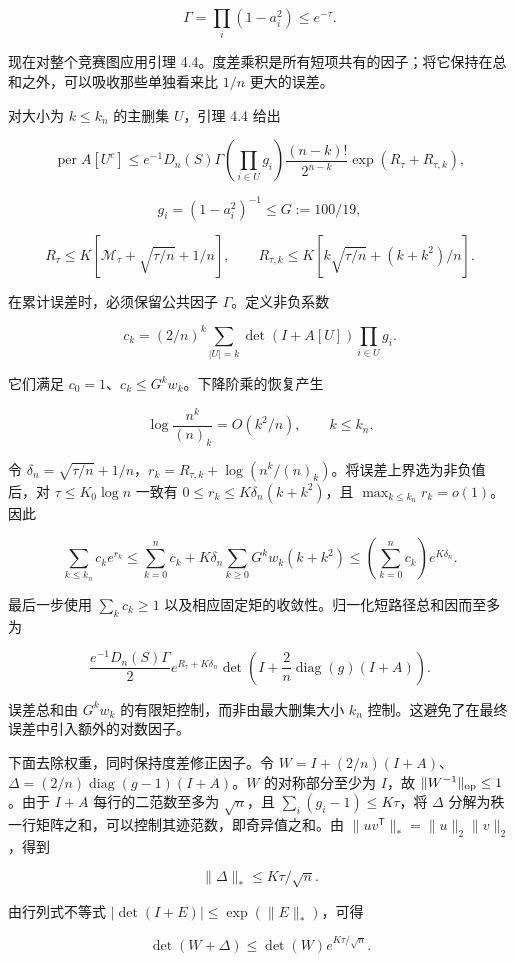 \documentclass[11pt,a4paper]{article}
\begin{document}
\[\Gamma=\prod_i(1-a_i^2)\le e^{-\tau}.\]

现在对整个竞赛图应用引理 4.4。度差乘积是所有短项共有的因子；将它保持在总和之外，可以吸收那些单独看来比 \(1/n\) 更大的误差。

对大小为 \(k\le k_n\) 的主删集 \(U\)，引理 4.4 给出

\[\operatorname{per}A[U^c]\le
e^{-1}D_n(S)\Gamma
\left(\prod_{i\in U}g_i\right)
\frac{(n-k)!}{2^{n-k}}\exp(R_\tau+R_{\tau,k}),\]

\[g_i=(1-a_i^2)^{-1}\le G:=100/19,\]

\[R_\tau\le K[\mathcal M_\tau+\sqrt{\tau/n}+1/n],\qquad
R_{\tau,k}\le K[k\sqrt{\tau/n}+(k+k^2)/n].\]

在累计误差时，必须保留公共因子 \(\Gamma\)。定义非负系数

\[c_k=(2/n)^k\sum_{|U|=k}\det(I+A[U])\prod_{i\in U}g_i.\]

它们满足 \(c_0=1\)、\(c_k\le G^kw_k\)。下降阶乘的恢复产生

\[\log\frac{n^k}{(n)_k}=O(k^2/n),\qquad k\le k_n.\]

令 \(\delta_n=\sqrt{\tau/n}+1/n\)，\(r_k=R_{\tau,k}+\log(n^k/(n)_k)\)。将误差上界选为非负值后，对 \(\tau\le K_0\log n\) 一致有 \(0\le r_k\le K\delta_n(k+k^2)\)，且 \(\max_{k\le k_n}r_k=o(1)\)。因此

\[\sum_{k\le k_n}c_ke^{r_k}
\le\sum_{k=0}^{n}c_k+
K\delta_n\sum_{k\ge0}G^kw_k(k+k^2)
\le\left(\sum_{k=0}^{n}c_k\right)e^{K\delta_n}.\]

最后一步使用 \(\sum_kc_k\ge1\) 以及相应固定矩的收敛性。归一化短路径总和因而至多为

\[\frac{e^{-1}D_n(S)\Gamma}{2}
e^{R_\tau+K\delta_n}
\det\left(I+\frac2n\operatorname{diag}(g)(I+A)\right).\]

误差总和由 \(G^kw_k\) 的有限矩控制，而非由最大删集大小 \(k_n\) 控制。这避免了在最终误差中引入额外的对数因子。

下面去除权重，同时保持度差修正因子。令 \(W=I+(2/n)(I+A)\)、\(\Delta=(2/n)\operatorname{diag}(g-1)(I+A)\)。\(W\) 的对称部分至少为 \(I\)，故 \(\|W^{-1}\|_{\rm op}\le1\)。由于 \(I+A\) 每行的二范数至多为 \(\sqrt n\)，且 \(\sum_i(g_i-1)\le K\tau\)，将 \(\Delta\) 分解为秩一行矩阵之和，可以控制其迹范数，即奇异值之和。由 \(\|uv^{\mathsf T}\|_*=\|u\|_2\|v\|_2\)，得到

\[\|\Delta\|_*\le K\tau/\sqrt n.\]

由行列式不等式 \(|\det(I+E)|\le\exp(\|E\|_*)\)，可得

\[\det(W+\Delta)\le\det(W)e^{K\tau/\sqrt n}.\]
\end{document}

